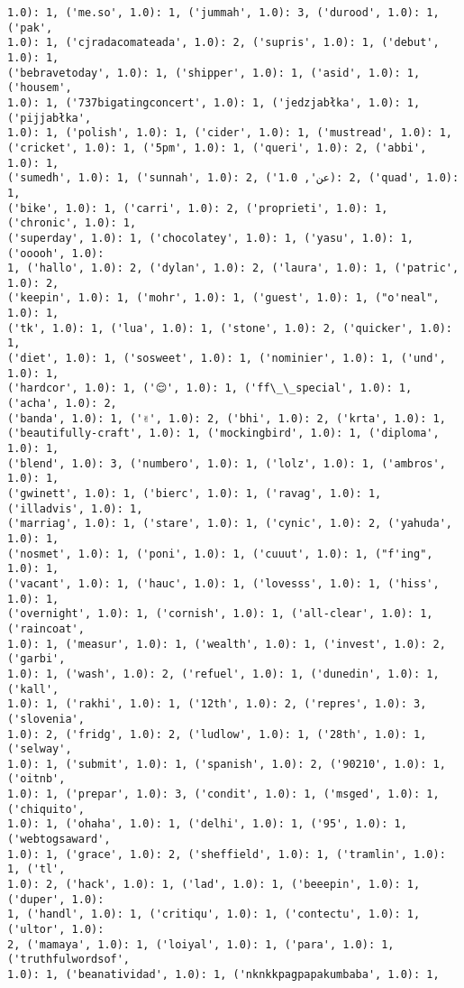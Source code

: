 \documentclass[11pt]{article}
\begin{document}
\begin{Verbatim}[commandchars=\\\{\}]
1.0): 1, ('me.so', 1.0): 1, ('jummah', 1.0): 3, ('durood', 1.0): 1, ('pak',
1.0): 1, ('cjradacomateada', 1.0): 2, ('supris', 1.0): 1, ('debut', 1.0): 1,
('bebravetoday', 1.0): 1, ('shipper', 1.0): 1, ('asid', 1.0): 1, ('housem',
1.0): 1, ('737bigatingconcert', 1.0): 1, ('jedzjabłka', 1.0): 1, ('pijjabłka',
1.0): 1, ('polish', 1.0): 1, ('cider', 1.0): 1, ('mustread', 1.0): 1,
('cricket', 1.0): 1, ('5pm', 1.0): 1, ('queri', 1.0): 2, ('abbi', 1.0): 1,
('sumedh', 1.0): 1, ('sunnah', 1.0): 2, ('عن', 1.0): 2, ('quad', 1.0): 1,
('bike', 1.0): 1, ('carri', 1.0): 2, ('proprieti', 1.0): 1, ('chronic', 1.0): 1,
('superday', 1.0): 1, ('chocolatey', 1.0): 1, ('yasu', 1.0): 1, ('ooooh', 1.0):
1, ('hallo', 1.0): 2, ('dylan', 1.0): 2, ('laura', 1.0): 1, ('patric', 1.0): 2,
('keepin', 1.0): 1, ('mohr', 1.0): 1, ('guest', 1.0): 1, ("o'neal", 1.0): 1,
('tk', 1.0): 1, ('lua', 1.0): 1, ('stone', 1.0): 2, ('quicker', 1.0): 1,
('diet', 1.0): 1, ('sosweet', 1.0): 1, ('nominier', 1.0): 1, ('und', 1.0): 1,
('hardcor', 1.0): 1, ('😌', 1.0): 1, ('ff\_\_special', 1.0): 1, ('acha', 1.0): 2,
('banda', 1.0): 1, ('✌', 1.0): 2, ('bhi', 1.0): 2, ('krta', 1.0): 1,
('beautifully-craft', 1.0): 1, ('mockingbird', 1.0): 1, ('diploma', 1.0): 1,
('blend', 1.0): 3, ('numbero', 1.0): 1, ('lolz', 1.0): 1, ('ambros', 1.0): 1,
('gwinett', 1.0): 1, ('bierc', 1.0): 1, ('ravag', 1.0): 1, ('illadvis', 1.0): 1,
('marriag', 1.0): 1, ('stare', 1.0): 1, ('cynic', 1.0): 2, ('yahuda', 1.0): 1,
('nosmet', 1.0): 1, ('poni', 1.0): 1, ('cuuut', 1.0): 1, ("f'ing", 1.0): 1,
('vacant', 1.0): 1, ('hauc', 1.0): 1, ('lovesss', 1.0): 1, ('hiss', 1.0): 1,
('overnight', 1.0): 1, ('cornish', 1.0): 1, ('all-clear', 1.0): 1, ('raincoat',
1.0): 1, ('measur', 1.0): 1, ('wealth', 1.0): 1, ('invest', 1.0): 2, ('garbi',
1.0): 1, ('wash', 1.0): 2, ('refuel', 1.0): 1, ('dunedin', 1.0): 1, ('kall',
1.0): 1, ('rakhi', 1.0): 1, ('12th', 1.0): 2, ('repres', 1.0): 3, ('slovenia',
1.0): 2, ('fridg', 1.0): 2, ('ludlow', 1.0): 1, ('28th', 1.0): 1, ('selway',
1.0): 1, ('submit', 1.0): 1, ('spanish', 1.0): 2, ('90210', 1.0): 1, ('oitnb',
1.0): 1, ('prepar', 1.0): 3, ('condit', 1.0): 1, ('msged', 1.0): 1, ('chiquito',
1.0): 1, ('ohaha', 1.0): 1, ('delhi', 1.0): 1, ('95', 1.0): 1, ('webtogsaward',
1.0): 1, ('grace', 1.0): 2, ('sheffield', 1.0): 1, ('tramlin', 1.0): 1, ('tl',
1.0): 2, ('hack', 1.0): 1, ('lad', 1.0): 1, ('beeepin', 1.0): 1, ('duper', 1.0):
1, ('handl', 1.0): 1, ('critiqu', 1.0): 1, ('contectu', 1.0): 1, ('ultor', 1.0):
2, ('mamaya', 1.0): 1, ('loiyal', 1.0): 1, ('para', 1.0): 1, ('truthfulwordsof',
1.0): 1, ('beanatividad', 1.0): 1, ('nknkkpagpapakumbaba', 1.0): 1,

\end{Verbatim}
\end{document}
